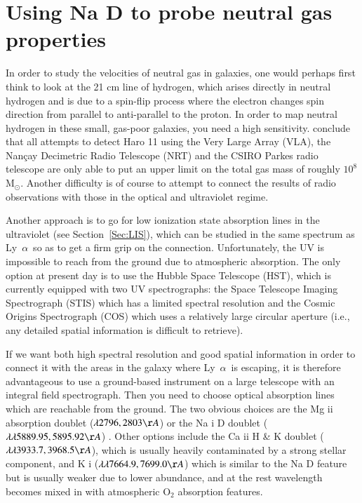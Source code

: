 \documentclass[a4wide,12pt]{book}
\newcommand{\msun}{$\mathrm{M}_{\odot}$}
\newcommand{\lya}{Ly~${\alpha}$}
\begin{document}
{\chapter{Using Na D to probe neutral gas properties}
\label{Sec:NaD}

In order to study the velocities of neutral gas in galaxies, one would perhaps first think to look at the 21 cm line of hydrogen, which arises directly in neutral hydrogen and is due to a spin-flip process where the electron changes spin direction from parallel to anti-parallel to the proton.
In order to map neutral hydrogen in these small, gas-poor galaxies, you need a high sensitivity. \citet{bergvall-2006} conclude that all attempts to detect Haro 11 using the Very Large Array (VLA), the Nan\c{c}ay Decimetric Radio Telescope (NRT) and the CSIRO Parkes radio telescope are only able to put an upper limit on the total gas mass of roughly $10^8$ \msun . Another difficulty is of course to attempt to connect the results of radio observations with those in the optical and ultraviolet regime. 

Another approach is to go for low ionization state absorption lines in the ultraviolet (see Section~\ref{Sec:LIS}), which can be studied in the same spectrum as \lya\ so as to get a firm grip on the connection. Unfortunately, the UV is impossible to reach from the ground due to atmospheric absorption. The only option at present day is to use the Hubble Space Telescope (HST), which is currently equipped with two UV spectrographs: the Space Telescope Imaging Spectrograph (STIS) which has a limited spectral resolution and the Cosmic Origins Spectrograph (COS) which uses a relatively large circular aperture (i.e., any detailed spatial information is difficult to retrieve).

If we want both high spectral resolution and good spatial information in order to connect it with the areas in the galaxy where \lya\ is escaping, it is therefore advantageous to use a ground-based instrument on a large telescope with an integral field spectrograph. Then you need to choose optical absorption lines which are reachable from the ground. The two obvious choices are the Mg {\sc ii} absorption doublet ($\lambda 2796, 2803 \AA$) \citep[e.g.][]{churchill-vogt2001,mshar-2007,martin-bouche2009,nestor-2011} or the Na {\sc i} D doublet ($\lambda \lambda 5889.95, 5895.92 \AA$) \citep[e.g.][]{heckman-2000,rupke-2002,martin2005,chen-2010}. Other options include the Ca {\sc ii} H \& K doublet ($\lambda \lambda 3933.7, 3968.5 \AA$), which is usually heavily contaminated by a strong stellar component, and K {\sc i} ($\lambda \lambda 7664.9, 7699.0 \AA $) which is similar to the Na D feature but is usually weaker due to lower abundance, and at the rest wavelength becomes mixed in with atmospheric $\mathrm{O}_2$ absorption features.

}
\end{document}
